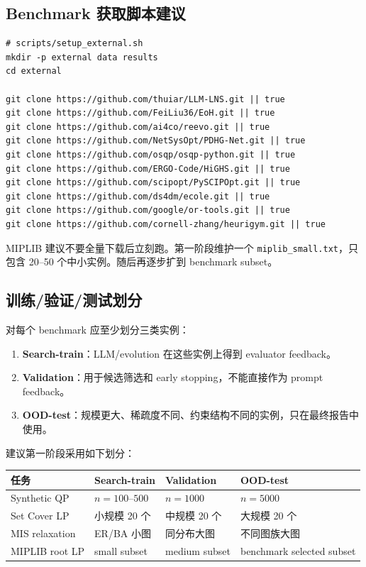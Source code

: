 \documentclass[12pt,a4paper]{ctexart}
\begin{document}
\subsection{Benchmark 获取脚本建议}

\begin{lstlisting}[style=bashstyle]
# scripts/setup_external.sh
mkdir -p external data results
cd external

git clone https://github.com/thuiar/LLM-LNS.git || true
git clone https://github.com/FeiLiu36/EoH.git || true
git clone https://github.com/ai4co/reevo.git || true
git clone https://github.com/NetSysOpt/PDHG-Net.git || true
git clone https://github.com/osqp/osqp-python.git || true
git clone https://github.com/ERGO-Code/HiGHS.git || true
git clone https://github.com/scipopt/PySCIPOpt.git || true
git clone https://github.com/ds4dm/ecole.git || true
git clone https://github.com/google/or-tools.git || true
git clone https://github.com/cornell-zhang/heurigym.git || true
\end{lstlisting}

MIPLIB 建议不要全量下载后立刻跑。第一阶段维护一个 \texttt{miplib\_small.txt}，只包含 20--50 个中小实例。随后再逐步扩到 benchmark subset。

\subsection{训练/验证/测试划分}
对每个 benchmark 应至少划分三类实例：
\begin{enumerate}
    \item \textbf{Search-train}：LLM/evolution 在这些实例上得到 evaluator feedback。
    \item \textbf{Validation}：用于候选筛选和 early stopping，不能直接作为 prompt feedback。
    \item \textbf{OOD-test}：规模更大、稀疏度不同、约束结构不同的实例，只在最终报告中使用。
\end{enumerate}

建议第一阶段采用如下划分：
\begin{longtable}{p{}p{}p{}p{}}
\toprule
任务 & Search-train & Validation & OOD-test \\
\midrule
Synthetic QP & $n=100$--$500$ & $n=1000$ & $n=5000$ \\
Set Cover LP & 小规模 20 个 & 中规模 20 个 & 大规模 20 个 \\
MIS relaxation & ER/BA 小图 & 同分布大图 & 不同图族大图 \\
MIPLIB root LP & small subset & medium subset & benchmark selected subset \\
\bottomrule
\end{longtable}
\end{document}
